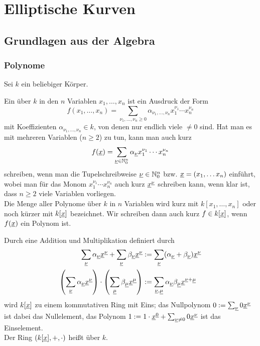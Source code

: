 \section{Elliptische Kurven}
\label{sec:para2}
\nextlecture
\subsection{Grundlagen aus der Algebra}
\subsubsection{Polynome}
	Sei $k$ ein beliebiger Körper. 
	\marginnote{[7]}
	
\begin{defn}[Polynom]
	Ein  über $k$ in den $n$ Variablen $x_1,\dots,x_n$ ist ein Ausdruck der Form
	\[ f(x_1,\dots,x_n) = \sum\limits_{\nu_1,\dots,\nu_n \geq 0} \alpha_{\nu_1, \dots, \nu_n} x_1^{\nu_1} \cdots x_n^{\nu_n} \]
	mit Koeffizienten $\alpha_{\nu_1,\dots,\nu_n} \in k$, von denen nur endlich viele $\neq 0$ sind. 
	Hat man es mit mehreren Variablen ($n \geq 2$) zu tun, kann man auch kurz
	\[ f(\underline{x}) = \sum_{\uline{\nu} \in \NN_0^n} \alpha_{\uline{\nu}} x_1^{\nu_1} \cdots x_n^{\nu_n} \]
	schreiben, wenn man die Tupelschreibweise $\uline{\nu} \in \NN_0^n$ bzw. $\uline{x} = (x_1, \dots x_n)$ einführt, wobei man für das Monom $x_1^{\nu_1} \cdots x_n^{\nu_n}$ auch kurz $\uline{x}^{\uline{\nu}}$ schreiben kann, wenn klar ist, dass $n \geq 2$ viele Variablen vorliegen. \\
	Die Menge aller Polynome über $k$ in $n$ Variablen wird kurz mit $k[x_1,\dots,x_n]$ oder noch kürzer mit $k[\uline{x}]$ bezeichnet.
	Wir schreiben dann auch kurz $f \in k[\uline{x}]$, wenn $f(\uline{x})$ ein Polynom ist.
\end{defn}

\begin{bem}
	Durch eine Addition und Multiplikation definiert durch
	\begin{equation}
	\begin{aligned}
		\sum_{\uline{\nu}} \alpha_{\uline{\nu}} \uline{x}^{\uline{\nu}} + \sum_{\uline{\nu}} \beta_{\uline{\nu}} \uline{x}^{\uline{\nu}} &:= \sum_{\uline{\nu}} (\alpha_{\uline{\nu}} + \beta_{\uline{\nu}}) \uline{x}^{\uline{\nu}} \\
		\enbrace*{\sum_{\uline{\nu}} \alpha_{\uline{\nu}} \uline{x}^{\uline{\nu}}} \cdot \enbrace*{\sum_{\uline{\mu}} \beta_{\uline{\mu}} \uline{x}^{\uline{\mu}}} &:= \sum_{\uline{\nu},\uline{\mu}} \alpha_{\uline{\nu}} \beta_{\uline{\mu}} \uline{x}^{\uline{\nu} + \uline{\mu}}
	\end{aligned}
	\end{equation}
	wird $k[\uline{x}]$ zu einem kommutativen Ring mit Eins; das Nullpolynom $0 := \sum_{\uline{\nu}} 0 \uline{x}^{\uline{\nu}}$ ist dabei das Nullelement, das Polynom $1 := 1 \cdot \uline{x}^{\uline{0}} + \sum_{\uline{\nu} \neq 0} 0 \uline{x}^{\uline{\nu}}$ ist das Einselement. 
	 \\
	Der Ring $(k[\uline{x}],+,\cdot)$ heißt  über $k$.
\end{bem}

